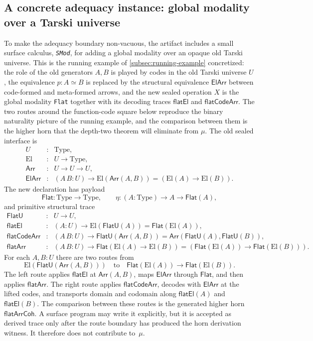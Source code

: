 \documentclass{lmcs}
\newcommand{\Type}{\mathrm{Type}}
\newcommand{\El}{\mathrm{El}}
\begin{document}
\subsection{A concrete adequacy instance: global modality over a Tarski universe}
\label{subsec:smod-adequacy}

To make the adequacy boundary non-vacuous, the artifact includes a small surface calculus, \emph{\texttt{SMod}}, for adding a global modality over an opaque old Tarski universe. This is the running example of \autoref{subsec:running-example} concretized: the role of the old generators $A,B$ is played by codes in the old Tarski universe $U$, the equivalence $p:A\simeq B$ is replaced by the structural equivalence $\mathsf{ElArr}$ between code-formed and meta-formed arrows, and the new sealed operation $X$ is the global modality \texttt{Flat} together with its decoding traces $\mathsf{flatEl}$ and $\mathsf{flatCodeArr}$. The two routes around the function-code square below reproduce the binary naturality picture of the running example, and the comparison between them is the higher horn that the depth-two theorem will eliminate from $\mu$. The old sealed interface is
\[
\begin{array}{rcl}
  U&:&\Type,\\
  \El&:&U\to\Type,\\
  \mathsf{Arr}&:&U\to U\to U,\\
  \mathsf{ElArr}&:&(A\,B:U)\to
    \El(\mathsf{Arr}(A,B))=(\El(A)\to\El(B)).
\end{array}
\]
The new declaration has payload
\[
  \mathsf{Flat}:\Type\to\Type,
  \qquad
  \eta:(A:\Type)\to A\to\mathsf{Flat}(A),
\]
and primitive structural trace
\[
\begin{array}{rcl}
  \mathsf{FlatU}&:&U\to U,\\
  \mathsf{flatEl}&:&(A:U)\to
    \El(\mathsf{FlatU}(A))=\mathsf{Flat}(\El(A)),\\
  \mathsf{flatCodeArr}&:&(A\,B:U)\to
    \mathsf{FlatU}(\mathsf{Arr}(A,B))=
    \mathsf{Arr}(\mathsf{FlatU}(A),\mathsf{FlatU}(B)),\\
  \mathsf{flatArr}&:&(A\,B:U)\to
    \mathsf{Flat}(\El(A)\to\El(B))=
    (\mathsf{Flat}(\El(A))\to\mathsf{Flat}(\El(B))).
\end{array}
\]
For each $A,B:U$ there are two routes from
\[
  \El(\mathsf{FlatU}(\mathsf{Arr}(A,B)))
  \quad\text{to}\quad
  \mathsf{Flat}(\El(A))\to\mathsf{Flat}(\El(B)).
\]
The left route applies \(\mathsf{flatEl}\) at \(\mathsf{Arr}(A,B)\), maps
\(\mathsf{ElArr}\) through \(\mathsf{Flat}\), and then applies
\(\mathsf{flatArr}\). The right route applies \(\mathsf{flatCodeArr}\), decodes
with \(\mathsf{ElArr}\) at the lifted codes, and transports domain and codomain
along \(\mathsf{flatEl}(A)\) and \(\mathsf{flatEl}(B)\). The comparison between
these routes is the generated higher horn \(\mathsf{flatArrCoh}\). A surface
program may write it explicitly, but it is accepted as derived trace only
after the route boundary has produced the horn derivation witness. It therefore
does not contribute to~\(\mu\).
\end{document}
